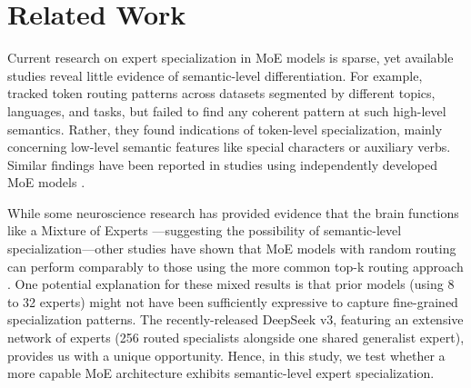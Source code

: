 \section{Related Work}
Current research on expert specialization in MoE models is sparse, yet available studies reveal little evidence of semantic-level differentiation. For example, \citet{xue2024openmoe} tracked token routing patterns across datasets segmented by different topics, languages, and tasks, but failed to find any coherent pattern at such high-level semantics. Rather, they found indications of token-level specialization, mainly concerning low-level semantic features like special characters or auxiliary verbs. Similar findings have been reported in studies using independently developed MoE models \citep[e.g.,][]{zoph2022stmoe, jiang2024mixtral, fan2024towards}.

While some neuroscience research has provided evidence that the brain functions like a Mixture of Experts \citep{stocco2010conditional,o2021and}---suggesting the possibility of semantic-level specialization---other studies have shown that MoE models with random routing can perform comparably to those using the more common top-k routing approach \citep{roller2021hash, zuo2021taming, ren2023pangu}. One potential explanation for these mixed results is that prior models (using 8 to 32 experts) might not have been sufficiently expressive to capture fine-grained specialization patterns. The recently-released DeepSeek v3, featuring an extensive network of experts (256 routed specialists alongside one shared generalist expert), provides us with a unique opportunity. Hence, in this study, we test whether a more capable MoE architecture exhibits semantic-level expert specialization.